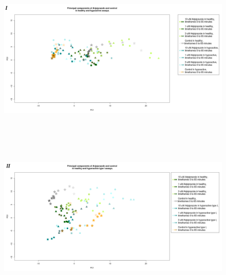 \documentclass[a4paper,12pt]{article}
\begin{document}
\begin{figure}[h!]
\begin{center}
\includegraphics[width=16cm,height=8cm]{Aripiprazole_Control_DarkApoLow_stratified.png}
\includegraphics[width=16cm,height=8cm]{Aripiprazole_Control_DarkApoHigh_stratified.png}
\end{center}
\end{figure}
\end{document}

